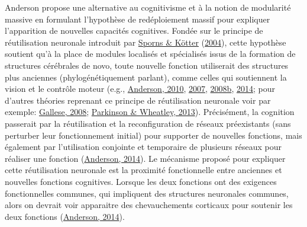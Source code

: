 \documentclass[
  a4paper,12pt,twoside,onecolumn,openright,final,oldfontcommands]{memoir}
\begin{document}
Anderson propose une alternative au cognitivisme et à la notion de modularité massive en formulant l'hypothèse de redéploiement massif pour expliquer l'apparition de nouvelles capacités cognitives. Fondée sur le principe de réutilisation neuronale introduit par \protect\hyperlink{ref-sporns_motifs_2004}{Sporns \& Kötter} (\protect\hyperlink{ref-sporns_motifs_2004}{2004}), cette hypothèse soutient qu'à la place de modules localisés et spécialisés issus de la formation de structures cérébrales de novo, toute nouvelle fonction utiliserait des structures plus anciennes (phylogénétiquement parlant), comme celles qui soutiennent la vision et le contrôle moteur (e.g., \protect\hyperlink{ref-anderson_neural_2010}{Anderson, 2010}, \protect\hyperlink{ref-anderson_evolution_2007}{2007}, \protect\hyperlink{ref-anderson_grounds_2008}{2008b}, \protect\hyperlink{ref-anderson_after_2014}{2014}; pour d'autres théories reprenant ce principe de réutilisation neuronale voir par exemple: \protect\hyperlink{ref-gallese_mirror_2008}{Gallese, 2008}; \protect\hyperlink{ref-parkinson_old_2013}{Parkinson \& Wheatley, 2013}). Précisément, la cognition passerait par la réutilisation et la reconfiguration de réseaux préexistants (sans perturber leur fonctionnement initial) pour supporter de nouvelles fonctions, mais également par l'utilisation conjointe et temporaire de plusieurs réseaux pour réaliser une fonction (\protect\hyperlink{ref-anderson_after_2014}{Anderson, 2014}). Le mécanisme proposé pour expliquer cette réutilisation neuronale est la proximité fonctionnelle entre anciennes et nouvelles fonctions cognitives. Lorsque les deux fonctions ont des exigences fonctionnelles communes, qui impliquent des structures neuronales communes, alors on devrait voir apparaitre des chevauchements corticaux pour soutenir les deux fonctions (\protect\hyperlink{ref-anderson_after_2014}{Anderson, 2014}).
\end{document}
